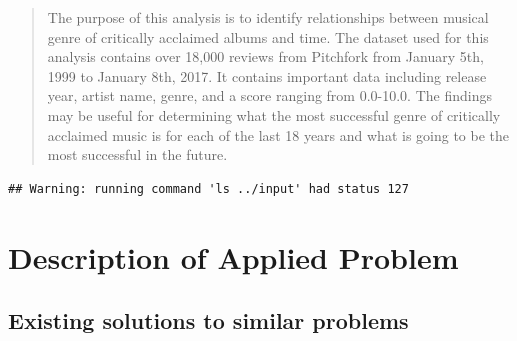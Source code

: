 \documentclass{article}
\begin{document}


\begin{abstract} 
{\bf } The purpose of this analysis is to identify relationships between
musical genre of critically acclaimed albums and time. The dataset used
for this analysis contains over 18,000 reviews from Pitchfork from
January 5th, 1999 to January 8th, 2017. It contains important data
including release year, artist name, genre, and a score ranging from
0.0-10.0. The findings may be useful for determining what the most
successful genre of critically acclaimed music is for each of the last
18 years and what is going to be the most successful in the future. \end{abstract} 


\begin{verbatim}
## Warning: running command 'ls ../input' had status 127
\end{verbatim}

\section{Description of Applied
Problem}\label{description-of-applied-problem}

\subsection{Existing solutions to similar
problems}\label{existing-solutions-to-similar-problems}
\end{document}
